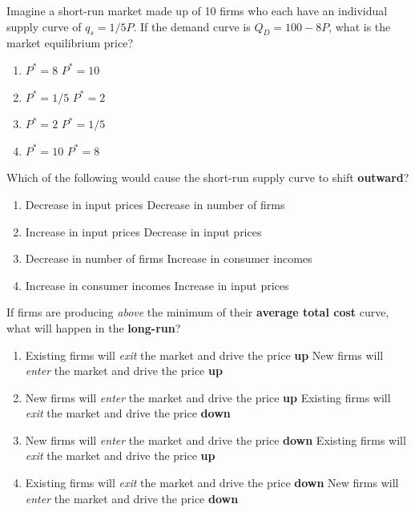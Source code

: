 \begin{question}[type=exam]{3}
  Imagine a short-run market made up of 10 firms
  who each have an individual supply curve of $q_s=1/5P$.
  If the demand curve is $Q_D=100-8P$,
  what is the market equilibrium price?
  \begin{enumerate}[label=\alph*), noitemsep]
    \item \vary
      {$P^*=8$}
      {$P^*=10$} %
    \item \vary
      {$P^*=1/5$}
      {$P^*=2$}
    \item \vary
      {$P^*=2$}
      {$P^*=1/5$}
    \item \vary
      {$P^*=10$} %
      {$P^*=8$}
  \end{enumerate}
\end{question}

\begin{question}[type=exam]{3}
  Which of the following would cause the short-run supply curve to shift \textbf{outward}?
  \begin{enumerate}[label=\alph*), noitemsep]
    \item \vary
      {Decrease in input prices} %
      {Decrease in number of firms}
    \item \vary
      {Increase in input prices}
      {Decrease in input prices} %
    \item \vary
      {Decrease in number of firms}
      {Increase in consumer incomes}
    \item \vary
      {Increase in consumer incomes}
      {Increase in input prices}
  \end{enumerate}
\end{question}

\begin{question}[type=exam]{3}
  If firms are producing \textit{above} the minimum of their \textbf{average total cost} curve,
  what will happen in the \textbf{long-run}?
  \begin{enumerate}[label=\alph*), noitemsep]
    \item \vary
      {Existing firms will \textit{exit} the market and drive the price \textbf{up}}
      {New firms will \textit{enter} the market and drive the price \textbf{up}}
    \item \vary
      {New firms will \textit{enter} the market and drive the price \textbf{up}}
      {Existing firms will \textit{exit} the market and drive the price \textbf{down}}
    \item \vary
      {New firms will \textit{enter} the market and drive the price \textbf{down}} %
      {Existing firms will \textit{exit} the market and drive the price \textbf{up}}
    \item \vary
      {Existing firms will \textit{exit} the market and drive the price \textbf{down}}
      {New firms will \textit{enter} the market and drive the price \textbf{down}} %
  \end{enumerate}
\end{question}


